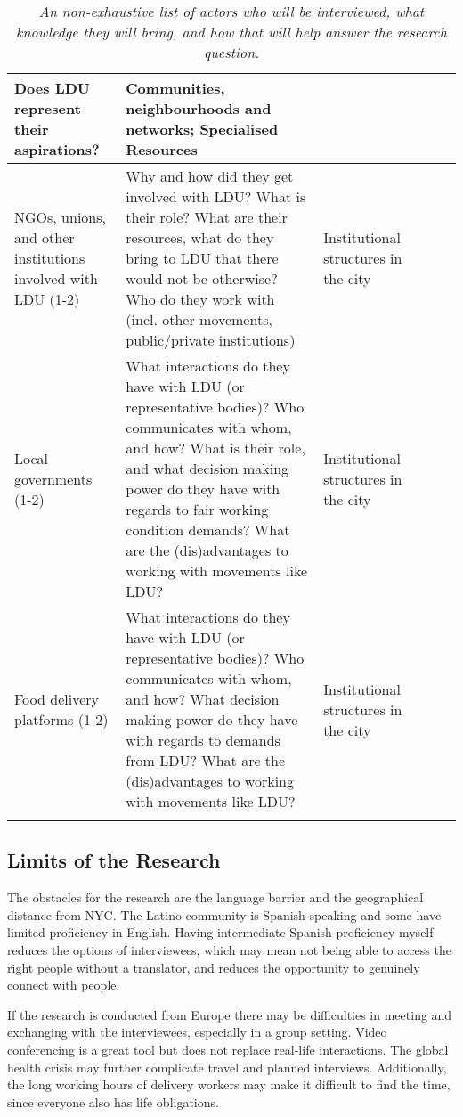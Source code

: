 \documentclass{article}[12pt]
\begin{document}
\begin{longtable}{ Lp{.35\textwidth} Lp{.60\textwidth} Lp{.4\textwidth}}
	Does LDU represent their aspirations?
	 &
	Communities, neighbourhoods and networks; Specialised Resources  \\ 
	\hline
	NGOs, unions, and other institutions involved with LDU (1-2) &
	Why and how did they get involved with LDU? What is their role? What are their resources, what do they bring to LDU that there would not be otherwise? Who do they work with (incl. other movements, public/private institutions)
	&
	Institutional structures in the city  \\ 
	\hline
	Local governments (1-2) &
	What interactions do they have with LDU (or representative bodies)? Who communicates with whom, and how? What is their role, and what decision making power do they have with regards to fair working condition demands? What are the (dis)advantages to working with movements like LDU? 
	&
	Institutional structures in the city  \\ 
	\hline
	Food delivery platforms (1-2) &
	What interactions do they have with LDU (or representative bodies)? Who communicates with whom, and how? What decision making power do they have with regards to demands from LDU? What are the (dis)advantages to working with movements like LDU? 
	&
	Institutional structures in the city  \\ 
\bottomrule
\caption{\textit{An non-exhaustive list of actors who will be interviewed, what knowledge they will bring, and how that will help answer the research question.}}
\label{interviews}
\end{longtable}

\subsection{Limits of the Research}

The obstacles for the research are the language barrier and the geographical distance from NYC. The Latino community is Spanish speaking and some have limited proficiency in English. Having intermediate Spanish proficiency myself reduces the options of interviewees, which may mean not being able to access the right people without a translator, and reduces the opportunity to genuinely connect with people.

If the research is conducted from Europe there may be difficulties in meeting and exchanging with the interviewees, especially in a group setting. Video conferencing is a great tool but does not replace real-life interactions. The global health crisis may further complicate travel and planned interviews. Additionally, the long working hours of delivery workers may make it difficult to find the time, since everyone also has life obligations.
\end{document}

